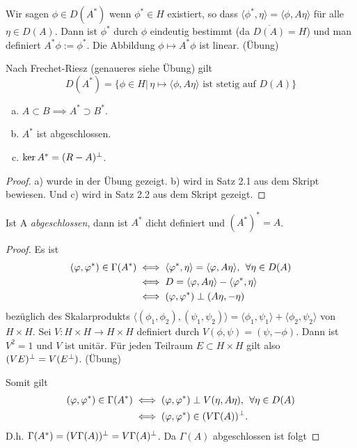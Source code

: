 \documentclass{mycourse}
\begin{document}
Wir sagen $\phi \in D(A^*)$ wenn $\phi^*\in H$ existiert, so dass $\langle \phi^*, \eta\rangle = \langle \phi, A\eta\rangle$ für alle $\eta \in D(A)$. Dann ist $\phi^*$ durch $\phi$ eindeutig bestimmt (da $\overline{D(A)}=H$) und man definiert $A^* \phi:= \phi^*$. Die Abbildung $\phi \mapsto A^*\phi$ ist linear. (Übung)

Nach Frechet-Riesz (genaueres siehe Übung) gilt
\[
D(A^*)=\{\phi\in H|\, \eta \mapsto \langle \phi, A\eta\rangle \text{ ist stetig auf } D(A)\}
\]

\begin{st}
\begin{enumerate}[a)]
\item $A\subset B \implies A^*\supset B^*$.
\item $A^*$ ist abgeschlossen.
\item $\ker A^*=(R-A)^\perp$. 
\end{enumerate}
\end{st}
\begin{proof}
a) wurde in der Übung gezeigt. b) wird in Satz 2.1 aus dem Skript bewiesen. Und c) wird in Satz 2.2 aus dem Skript gezeigt.
\end{proof}
\begin{st}
Ist A \emph{abgeschlossen}, dann ist $A^*$ dicht definiert und $(A^*)^*=A$.
\end{st}
\begin{proof}
Es ist
\begin{align*}
(\phi, \phi^*)\in \Gamma(A^*) &\iff \langle \phi^*, \eta\rangle = \langle \phi, A\eta\rangle, \, \forall \eta\in D(A)\\ &\iff D=\langle \phi, A\eta\rangle - \langle \phi^*, \eta\rangle \\ &\iff (\phi, \phi^*) \orth (A\eta, - \eta)
\end{align*}
bezüglich des Skalarprodukts $\langle (\phi_1, \phi_2), (\psi_1, \psi_2)\rangle=\langle \phi_1, \psi_1\rangle + \langle \phi_2, \psi_2\rangle$ von $H\times H$. Sei $V:H\times H \to H \times H$ definiert durch $V(\phi, \psi)=(\psi, -\phi)$. Dann ist $V^2=1$ und $V$ ist unitär. Für jeden Teilraum $E\subset H\times H$ gilt also $(VE)^\perp = V(E^\perp)$. (Übung)

Somit gilt
\begin{align*}
(\phi, \phi^*) \in \Gamma(A^*) &\iff (\phi, \phi^*) \orth V(\eta, A\eta), \, \forall \eta\in D(A)\\
&\iff (\phi, \phi^*)\in (V\Gamma(A))^\orth.
\end{align*}
D.h. $\Gamma(A^*)=(V\Gamma(A))^\perp=V\Gamma(A)^\perp$. Da $\Gamma(A)$ abgeschlossen ist folgt 
\end{proof}
\end{document}

